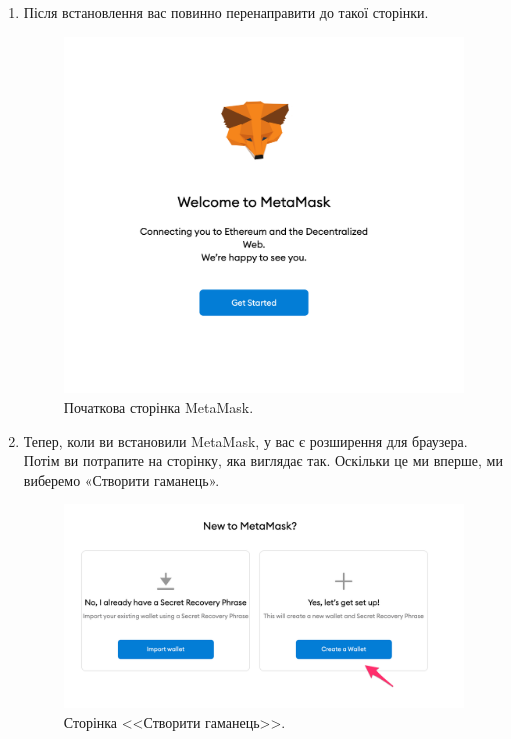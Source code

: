 \begin{enumerate}

\item Після встановлення вас повинно перенаправити до такої сторінки.

    \begin{figure}[ht]
            \centering
            \includegraphics[scale=0.4]{IMAGES/metamask7.png}
            \caption{Початкова сторінка MetaMask.}
            \label{fig_pacman}
    \end{figure}

\item Тепер, коли ви встановили MetaMask, у вас є розширення для браузера. Потім ви потрапите на сторінку, яка виглядає так. Оскільки це ми вперше, ми виберемо «Створити гаманець».

    \begin{figure}[ht]
            \centering
            \includegraphics[scale=0.4]{IMAGES/metamask8.png}
            \caption{Сторінка <<Створити гаманець>>.}
            \label{fig_pacman}
    \end{figure}


\end{enumerate}
